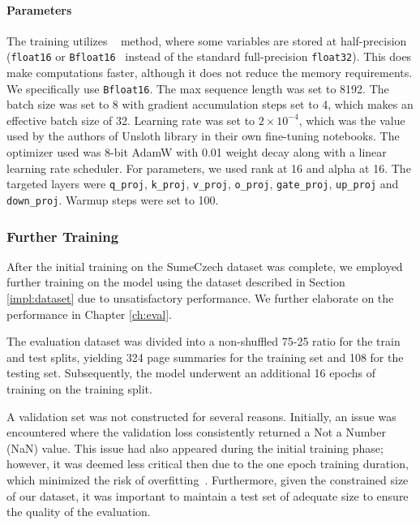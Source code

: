 \documentclass[english, ba, kiv, he, iso690numb, pdf, viewonly]{fasthesis}
\begin{document}
\paragraph{Parameters}
The training utilizes ~\cite{micikevicius2018mixed} method, where some variables are stored at half-precision (\texttt{float16} or \texttt{Bfloat16}~\cite{kalamkar2019study} instead of the standard full-precision \texttt{float32}). This does make computations faster, although it does not reduce the memory requirements. We specifically use \texttt{Bfloat16}. The max sequence length was set to 8192. The batch size was set to 8 with gradient accumulation steps set to 4, which makes an effective batch size of 32. Learning rate was set to $2 \times 10^{-4}$, which was the value used by the authors of Unsloth library in their own fine-tuning notebooks. The optimizer used was 8-bit AdamW with 0.01 weight decay along with a linear learning rate scheduler. For  parameters, we used rank at 16 and alpha at 16. The targeted layers were \texttt{q\_proj}, \texttt{k\_proj}, \texttt{v\_proj}, \texttt{o\_proj}, \texttt{gate\_proj}, \texttt{up\_proj} and \texttt{down\_proj}. Warmup steps were set to 100.

\subsubsection{Further Training} \label{impl:mistral:furthertraining}
After the initial training on the SumeCzech dataset was complete, we employed further training on the model using the dataset described in Section \ref{impl:dataset} due to unsatisfactory performance. We further elaborate on the performance in Chapter \ref{ch:eval}.

The evaluation dataset was divided into a non-shuffled 75-25 ratio for the train and test splits, yielding 324 page summaries for the training set and 108 for the testing set. Subsequently, the model underwent an additional 16 epochs of training on the training split.

A validation set was not constructed for several reasons. Initially, an issue was encountered where the validation loss consistently returned a Not a Number (NaN) value. This issue had also appeared during the initial training phase; however, it was deemed less critical then due to the one epoch training duration, which minimized the risk of overfitting~\cite{komatsuzaki2019epoch}. Furthermore, given the constrained size of our dataset, it was important to maintain a test set of adequate size to ensure the quality of the evaluation. 
\end{document}
